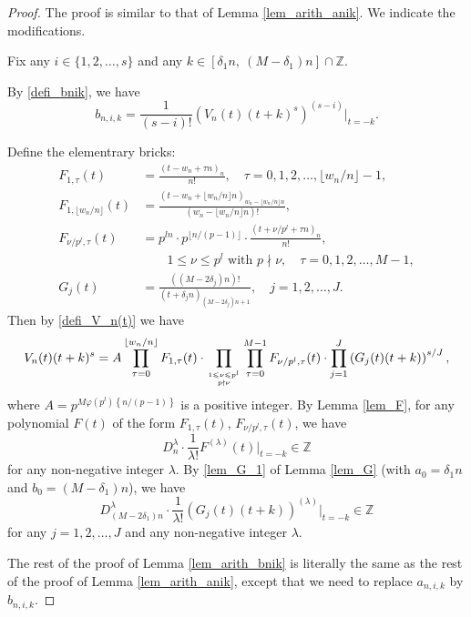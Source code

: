\documentclass[12pt]{article}
\numberwithin{equation}{section}
\begin{document}
\begin{proof}
The proof is similar to that of Lemma \ref{lem_arith_anik}. We indicate the modifications.

Fix any $i \in \{1,2,\ldots,s\}$ and any $k \in [\delta_1n,~(M-\delta_1)n] \cap \mathbb{Z}$.

By \eqref{defi_bnik}, we have
\begin{equation*}
	b_{n,i,k} = \frac{1}{(s-i)!} \left( V_n(t)(t+k)^{s} \right)^{(s-i)} \Big|_{t=-k}.
\end{equation*}

Define the elementrary bricks:
\begin{align*}
F_{1,\tau}(t) &= \frac{(t-w_n +\tau n)_n}{n!}, \quad \tau = 0,1,2,\ldots,\lfloor w_n/n\rfloor - 1, \\
F_{1,\lfloor w_n/n\rfloor}(t) &=  \frac{(t-w_n+\lfloor w_n/n\rfloor n)_{w_n - \lfloor w_n/n\rfloor n}}{(w_n - \lfloor w_n/n\rfloor n)!}, \\
F_{\nu/p^l,\tau}(t) &= p^{ln} \cdot p^{\lfloor n/(p-1)\rfloor} \cdot \frac{(t+\nu/p^l+\tau n)_n}{n!}, \\
&\qquad  1 \leqslant \nu \leqslant p^l \text{~with~} p \nmid \nu, \quad \tau=0,1,2,\ldots,M-1, \\
G_j(t) &=  \frac{((M-2\delta_j)n)!}{(t+\delta_jn)_{(M-2\delta_j)n+1}}, \quad j=1,2,\ldots,J.
\end{align*}
Then by \eqref{defi_V_n(t)} we have
\[ V_n(t)(t+k)^s = A \prod_{\tau=0}^{\lfloor w_n/n\rfloor} F_{1,\tau}(t) \cdot \prod_{1 \leqslant \nu \leqslant p^l \atop p \nmid \nu }\prod_{\tau=0}^{M-1} F_{\nu/p^l,\tau}(t) \cdot \prod_{j=1}^{J} \left(G_j(t)(t+k)\right)^{s/J},   \]
where $A = p^{M\varphi(p^l)\left\{ n/(p-1) \right\}}$ is a positive integer. By Lemma \ref{lem_F}, for any polynomial $F(t)$ of the form $F_{1,\tau}(t)$, $F_{\nu/p^l,\tau}(t)$, we have
\begin{equation*}
	D_{n}^{\lambda} \cdot \frac{1}{\lambda!} F^{(\lambda)}(t) \big|_{t=-k} \in \mathbb{Z} 
\end{equation*} 
for any non-negative integer $\lambda$.
By \eqref{lem_G_1} of Lemma \ref{lem_G} (with $a_0 = \delta_1n$ and $b_0 = (M-\delta_1)n$), we have
\begin{equation*}
D_{(M-2\delta_1)n}^{\lambda} \cdot \frac{1}{\lambda!} \left( G_j(t)(t+k) \right)^{(\lambda)} \big|_{t=-k} \in \mathbb{Z} 
\end{equation*}
for any $j=1,2,\ldots,J$ and any non-negative integer $\lambda$.

The rest of the proof of Lemma \ref{lem_arith_bnik} is literally the same as the rest of the proof of Lemma \ref{lem_arith_anik}, except that we need to replace $a_{n,i,k}$ by $b_{n,i,k}$.
\end{proof}
\end{document}
